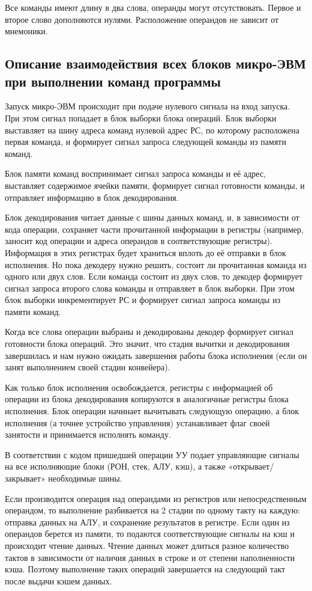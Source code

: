 Все команды имеют длину в два слова, операнды могут отсутствовать.
Первое и второе слово дополняются нулями.
Расположение операндов не зависит от мнемоники.

\subsection{Описание взаимодействия всех блоков микро-ЭВМ при выполнении команд программы}
Запуск микро-ЭВМ происходит при подаче нулевого сигнала на вход запуска. При этом сигнал попадает в блок выборки блока операций. Блок выборки выставляет на шину адреса команд нулевой адрес РС, по которому расположена первая команда, и формирует сигнал запроса следующей команды из памяти команд.

Блок памяти команд воспринимает сигнал запроса команды и её адрес, выставляет содержимое ячейки памяти, формирует сигнал готовности команды, и отправляет информацию в блок декодирования.

Блок декодирования читает данные с шины данных команд, и, в зависимости от кода операции, сохраняет части прочитанной информации в регистры (например, заносит код операции и адреса операндов в соответствующие регистры). Информация в этих регистрах будет храниться вплоть до её отправки в блок исполнения. Но пока декодеру нужно решить, состоит ли прочитанная команда из одного или двух слов. Если команда состоит из двух слов, то декодер формирует сигнал запроса второго слова команды и отправляет в блок выборки. При этом блок выборки инкрементирует РС и формирует сигнал запроса команды из памяти команд.

Когда все слова операции выбраны и декодированы декодер формирует сигнал готовности блока операций. Это значит, что стадия вычитки и декодирования завершилась и нам нужно ожидать завершения работы блока исполнения (если он занят выполнением своей стадии конвейера).

Как только блок исполнения освобождается, регистры с информацией об операции из блока декодирования копируются в аналогичные регистры блока исполнения. Блок операции начинает вычитывать следующую операцию, а блок исполнения (а точнее устройство управления) устанавливает флаг своей занятости и принимается исполнять команду.

В соответствии с кодом пришедшей операции УУ подает управляющие сигналы на все исполняющие блоки (РОН, стек, АЛУ, кэш), а также «открывает/закрывает» необходимые шины.

Если производится операция над операндами из регистров или непосредственным операндом, то выполнение разбивается на 2 стадии по одному такту на каждую: отправка данных на АЛУ, и сохранение результатов в регистре. Если один из операндов берется из памяти, то подаются соответствующие сигналы на кэш и происходит чтение данных. Чтение данных может длиться разное количество тактов в зависимости от наличия данных в строке и от степени наполненности кэша. Поэтому выполнение таких операций завершается на следующий такт после выдачи кэшем данных.


